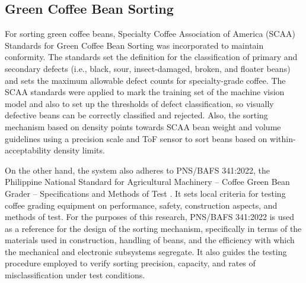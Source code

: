 \subsection{Green Coffee Bean Sorting}

For sorting green coffee beans, Specialty Coffee Association of America (SCAA) Standards for Green Coffee Bean Sorting was incorporated to maintain conformity. The standards set the definition for the classification of primary and secondary defects (i.e., black, sour, insect-damaged, broken, and floater beans) and sets the maximum allowable defect counts for specialty-grade coffee. The SCAA standards were applied to mark the training set of the machine vision model and also to set up the thresholds of defect classification, so visually defective beans can be correctly classified and rejected. Also, the sorting mechanism based on density points towards SCAA bean weight and volume guidelines using a precision scale and ToF sensor to sort beans based on within-acceptability density limits.

On the other hand, the system also adheres to PNS/BAFS 341:2022, the Philippine National Standard for Agricultural Machinery – Coffee Green Bean Grader – Specifications and Methods of Test \cite{Bureau_of_Agriculture_and_Fisheries_Standards_2022}. It sets local criteria for testing coffee grading equipment on performance, safety, construction aspects, and methods of test. For the purposes of this research, PNS/BAFS 341:2022 is used as a reference for the design of the sorting mechanism, specifically in terms of the materials used in construction, handling of beans, and the efficiency with which the mechanical and electronic subsystems segregate. It also guides the testing procedure employed to verify sorting precision, capacity, and rates of misclassification under test conditions. 
